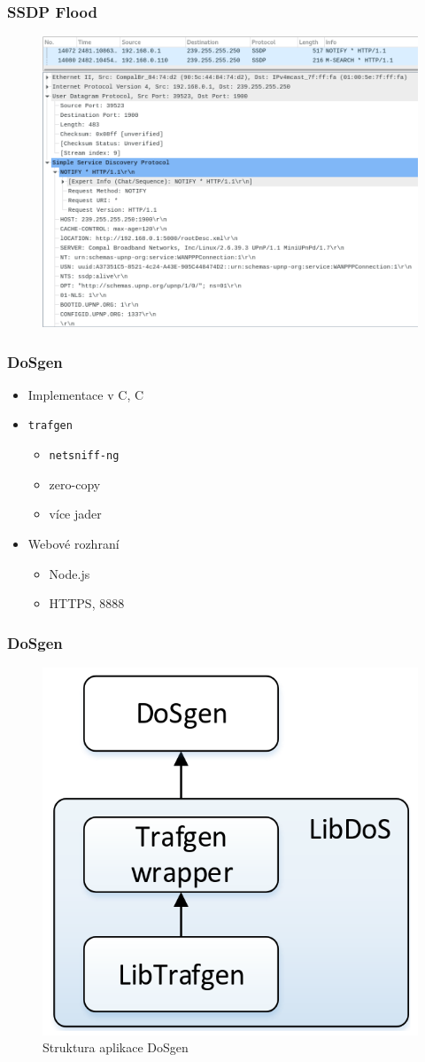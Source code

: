 \documentclass[%
  12pt,       				%
	t,                  %
	aspectratio=1610,   %
	unicode,						%
czech,              %
]{beamer}				    	%
\newcommand{\CC}{C\nolinebreak\hspace{-.05em}\raisebox{.4ex}{\tiny\bf +}\nolinebreak\hspace{-.10em}\raisebox{.4ex}{\tiny\bf +}}
\def\CC{{C\nolinebreak[4]\hspace{-.05em}\raisebox{.4ex}{\tiny\bf ++}}}
\begin{document}
\begin{frame}
\frametitle{SSDP Flood}
		\begin{figure}%
			\centering
			\vspace{0.4cm}	              %
			\includegraphics[width=0.659\columnwidth]{obrazky/ssdp_packets_wireshark.png}
		\end{figure}										%
\end{frame}


\begin{frame}
\frametitle{DoSgen}
\begin{itemize}
	\item Implementace v C, \CC
	\item \texttt{trafgen}
	\begin{itemize}
		\item \texttt{netsniff-ng}
		\item zero-copy
		\item více jader
	\end{itemize}
	\item Webové rozhraní
	\begin{itemize}
		\item Node.js
		\item HTTPS, 8888
	\end{itemize}
\end{itemize}
\end{frame}


\begin{frame}
\frametitle{DoSgen}
\begin{figure}%
	\centering
	\vspace{0.3cm}	              %
	\includegraphics[width=0.4\columnwidth]{obrazky/dosgen_halaska_diagrampng.png}
	\caption{Struktura aplikace DoSgen}%
\end{figure}
\end{frame}
\end{document}
